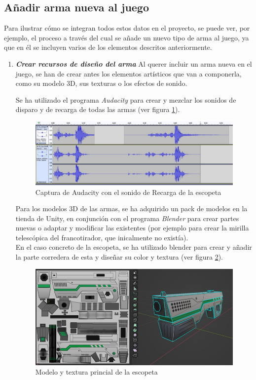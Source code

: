\subsection{Añadir arma nueva al juego}

Para ilustrar cómo se integran todos estos datos en el proyecto, se puede ver, por ejemplo, el proceso a través del cual se añade un nuevo tipo de arma al juego, ya que en él se incluyen varios de los elementos descritos anteriormente.

\begin{enumerate}
    \item \textbf{\textit{Crear recursos de diseño del arma}}
    Al querer incluir un arma nueva en el juego, se han de crear antes los elementos artísticos que van a componerla, como su modelo 3D, sus texturas o los efectos de sonido.
    
    Se ha utilizado el programa \textit{Audacity} \cite{wiki:Audacity} para crear y mezclar los sonidos de disparo y de recarga de todas las armas (ver figura \ref{fig:SonidosAudacity}).
    \begin{figure}[h]
    \centering
    \includegraphics[scale=0.45]{img/AudacityScreenshot.jpg}
    \caption{Captura de Audacity con el sonido de Recarga de la escopeta}
    \label{fig:SonidosAudacity}
    \end{figure}
    Para los modelos 3D de las armas, se ha adquirido un pack de modelos en la tienda de Unity, en conjunción con el programa \textit{Blender} \cite{wiki:Blender} para crear partes nuevas o adaptar y modificar las existentes (por ejemplo para crear la mirilla telescópica del francotirador, que inicalmente no existía).\\
    En el caso concreto de la escopeta, se ha utilizado blender para crear y añadir la parte corredera de esta y diseñar su color y textura (ver figura \ref{fig:EscopetaBlender}).
    
    \begin{figure}[h]
    \centering
    \includegraphics[scale=0.45]{img/ShotgunBlender.jpg}
    \caption{Modelo y textura princial de la escopeta}
    \label{fig:EscopetaBlender}
    \end{figure}
    

\end{enumerate}
